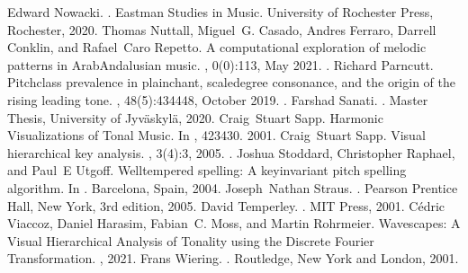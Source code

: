 \documentclass[letterpaper,10pt,english]{sphinxmanual}
\begin{document}
\begin{sphinxthebibliography}{10}
Edward Nowacki. . Eastman Studies in Music. University of Rochester Press, Rochester, 2020.
Thomas Nuttall, Miguel G. Casado, Andres Ferraro, Darrell Conklin, and Rafael Caro Repetto. A computational exploration of melodic patterns in Arab\sphinxhyphen{}Andalusian music. , 0(0):1\textendash{}13, May 2021. .
Richard Parncutt. Pitch\sphinxhyphen{}class prevalence in plainchant, scale\sphinxhyphen{}degree consonance, and the origin of the rising leading tone. , 48(5):434\textendash{}448, October 2019. .
Farshad Sanati. . Master Thesis, University of Jyväskylä, 2020.
Craig Stuart Sapp. Harmonic Visualizations of Tonal Music. In , 423\textendash{}430. 2001.
Craig Stuart Sapp. Visual hierarchical key analysis. , 3(4):3, 2005. .
Joshua Stoddard, Christopher Raphael, and Paul E Utgoff. Well\sphinxhyphen{}tempered spelling: A key\sphinxhyphen{}invariant pitch spelling algorithm. In . Barcelona, Spain, 2004.
Joseph Nathan Straus. . Pearson Prentice Hall, New York, 3rd edition, 2005.
David Temperley. . MIT Press, 2001.
Cédric Viaccoz, Daniel Harasim, Fabian C. Moss, and Martin Rohrmeier. Wavescapes: A Visual Hierarchical Analysis of Tonality using the Discrete Fourier Transformation. , 2021.
Frans Wiering. . Routledge, New York and London, 2001.
\end{sphinxthebibliography}


\renewcommand{\indexname}{Python Module Index}
\begin{sphinxtheindex}
\let\bigletter\sphinxstyleindexlettergroup
\bigletter{m}
\item\relax{}
\end{sphinxtheindex}

\renewcommand{\indexname}{Index}
\printindex
\end{document}
